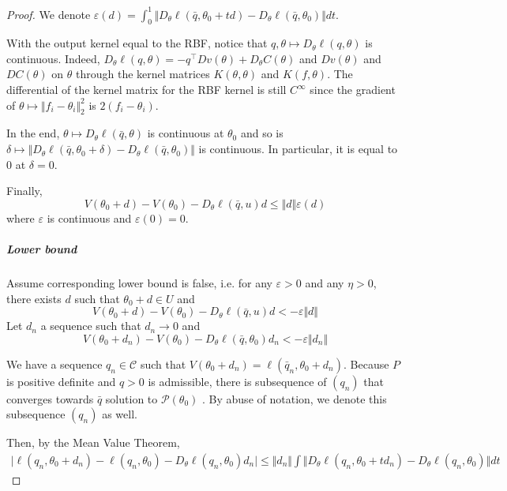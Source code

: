 \begin{proof}
We denote $\varepsilon(d)= \int_0^1 \Vert D_\theta\ell(\bar q, \theta_0 +td) - D_\theta\ell(\bar q, \theta_0)\Vert dt$.

With the output kernel equal to the RBF, notice that $q, \theta \mapsto D_\theta\ell(q, \theta)$ is continuous. Indeed, $D_\theta \ell(q, \theta) = -q^\top D v(\theta) + D_\theta C(\theta)$ and $D v(\theta)$ and $DC(\theta)$ on $\theta$ through the kernel matrices $K(\theta, \theta)$ and $K(f, \theta)$. The differential of the kernel matrix for the RBF kernel is still $C^\infty$ since the gradient of $\theta \mapsto \Vert f_i - \theta_i\Vert_2^2$ is $2(f_i - \theta_i)$.

In the end, $\theta \mapsto D_\theta\ell(\bar q, \theta)$ is continuous at $\theta_0$ and so is $ \delta \mapsto \Vert D_\theta\ell(\bar q, \theta_0 + \delta) -D_\theta\ell(\bar q, \theta_0)\Vert$ is continuous. In particular, it is equal to $0$ at $\delta=0$.

Finally,
   \begin{equation}
       V(\theta_0+d) - V(\theta_0) - D_\theta\ell(\bar q, u)d \leq \Vert d\Vert \varepsilon(d)
   \end{equation}
where $\varepsilon$ is continuous and $\varepsilon(0)=0$.


\subparagraph{Lower bound}
Assume corresponding lower bound is false, i.e. for any $\varepsilon>0$ and any $\eta >0$, there exists $d$ such that $\theta_0 + d\in U$ and
   \begin{equation}
       V(\theta_0+d) - V(\theta_0) - D_\theta\ell(\bar q, u)d < -\varepsilon\Vert d\Vert
   \end{equation}
    Let $d_n$ a sequence such that $d_n \to 0$ and
   \begin{equation}\label{eq:proof_hyp}
       V(\theta_0+d_n) - V(\theta_0) - D_\theta\ell(\bar q, \theta_0)d_n < -\varepsilon\Vert d_n\Vert
   \end{equation}

   We have a sequence $q_n\in \mathcal C$ such that $V(\theta_0+ d_n) = \ell(\bar q_n, \theta_0 + d_n)$. Because $P$ is positive definite and $q > 0$ is admissible, there is subsequence of $(q_n)$ that converges towards $\bar q$ solution to $\mathcal P(\theta_0)$ \citep[Lemma 14.4]{lee}. By abuse of notation, we denote this subsequence $(q_n)$ as well.

   Then, by the Mean Value Theorem,
   \begin{align}
       \vert \ell(q_n, \theta_0 + d_n) - \ell(q_n, \theta_0) - D_\theta \ell(q_n, \theta_0)d_n\vert \leq \Vert d_n\Vert \int \Vert D_\theta \ell(q_n, \theta_0 + td_n) - D_\theta \ell(q_n, \theta_0)\Vert dt
   \end{align}


\end{proof}
